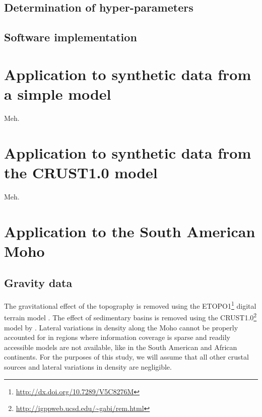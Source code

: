 \documentclass[extra]{gji}
\begin{document}
\subsection{Determination of hyper-parameters}



\subsection{Software implementation}



\section{Application to synthetic data from a simple model}


Meh.


\section{Application to synthetic data from the CRUST1.0 model}

Meh.


\section{Application to the South American Moho}


\subsection{Gravity data}

The gravitational effect of the topography
is removed using the
ETOPO1\footnote{\url{http://dx.doi.org/10.7289/V5C8276M}}
digital terrain model
\citep{amante_c._and_b._w._eakins_etopo1_2009}.
The effect of sedimentary basins is removed using the
CRUST1.0\footnote{\url{http://igppweb.ucsd.edu/~gabi/rem.html}} model
by
\citet{laske_update_2013}.
Lateral variations in density along the Moho cannot be properly accounted for
in regions where information coverage is sparse and readily accessible models
are not available, like in the South American and African continents.
For the purposes of this study, we will assume that all other crustal sources
and lateral variations in density are negligible.
\end{document}
